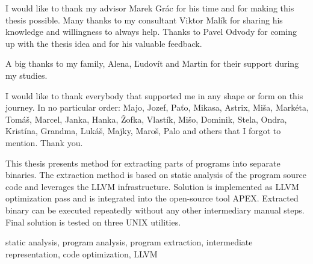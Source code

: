 \documentclass[12pt, twoside]{fithesis2}
\renewcommand{\_}{\leavevmode \kern0.07em\vbox{\hrule width0.4em}}
\begin{document}
\FrontMatter
\ThesisTitlePage

%
%
%
%

\begin{ThesisDeclaration}
    \DeclarationText
    \AdvisorName
\end{ThesisDeclaration}

\begin{ThesisThanks}
I would like to thank my advisor Marek Grác for his time and for making this
thesis possible.
Many thanks to my consultant Viktor Malík for sharing his knowledge and
willingness to always help.
Thanks to Pavel Odvody for coming up with the thesis idea and for his
valuable feedback.

A big thanks to my family, Alena, Ľudovít and Martin for their support
during my studies.

I would like to thank everybody that supported me in any shape or form on this
journey. In no particular order: Majo, Jozef, Paťo, Mikasa, Astrix,
Miša, Markéta, Tomáš, Marcel, Janka, Hanka, Žofka, Vlastík, Mišo, Dominik,
Stela, Ondra, Kristína, Grandma, Lukáš, Majky, Maroš, Palo and others that I
forgot to mention. Thank you.
\end{ThesisThanks}

\begin{ThesisAbstract}
This thesis presents method for extracting parts of programs into separate
binaries.
The extraction method is based on static analysis of the program source code
and leverages the LLVM infrastructure.
Solution is implemented as LLVM optimization pass and is integrated into the
open-source tool APEX.
Extracted binary can be executed repeatedly without any other intermediary
manual steps.
Final solution is tested on three UNIX utilities.

\end{ThesisAbstract}

\begin{ThesisKeyWords}
static analysis, program analysis, program extraction, intermediate
representation, code optimization, LLVM
\end{ThesisKeyWords}
\end{document}
